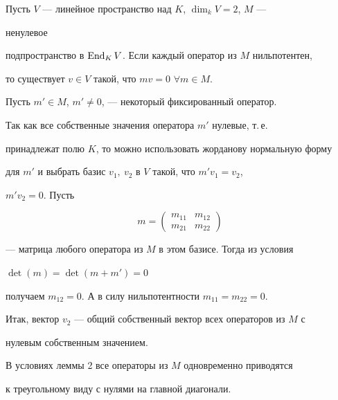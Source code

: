  


\begin{lem} 


Пусть $V$ --- линейное пространство над $K$, $\dim_k V=2$, $M$ --- 


ненулевое 


подпространство в $\operatorname{End}_K V$. Если каждый оператор из $M$ нильпотентен, 


то существует $v\in V$ такой, что $m v=0$ $\forall m\in M$. 


\end{lem} 


 


\begin{pf} 


Пусть $m'\in M$, $m'\ne0$, --- некоторый фиксированный оператор. 


Так как все собственные значения оператора $m'$ нулевые, т.\,е. 


принадлежат полю $K$, то можно использовать жорданову нормальную форму 


для $m'$ и выбрать базис $v_1,\ v_2$ в $V$ такой, что $m'v_1=v_2$, 


$m'v_2=0$. Пусть 


$$ 


m= 


\begin{pmatrix} 


m_{11} & m_{12} \\ m_{21} & m_{22} 


\end{pmatrix} 


$$ 


--- матрица любого оператора из $M$ в этом базисе. Тогда из условия 


$\det(m)=\det(m+m')=0$ 


получаем $m_{12}=0$. А в силу нильпотентности $m_{11}=m_{22}=0$. 


Итак, вектор $v_2$ --- общий собственный вектор всех операторов из $M$ с 


нулевым собственным значением. 


\end{pf} 


 


\begin{cor} 


В условиях леммы 2 все операторы из $M$ одновременно приводятся 


к треугольному виду с нулями на главной диагонали. 


\end{cor} 


